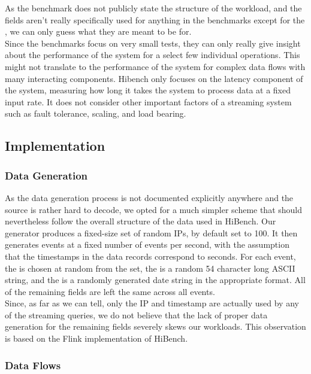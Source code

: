 As the benchmark does not publicly state the structure of the workload, and the fields aren't really specifically used for anything in the benchmarks except for the , we can only guess what they are meant to be for. \\

Since the benchmarks focus on very small tests, they can only really give insight about the performance of the system for a select few individual operations. This might not translate to the performance of the system for complex data flows with many interacting components. Hibench only focuses on the latency component of the system, measuring how long it takes the system to process data at a fixed input rate. It does not consider other important factors of a streaming system such as fault tolerance, scaling, and load bearing.

\subsection{Implementation}
\subsubsection{Data Generation}
As the data generation process is not documented explicitly anywhere and the source is rather hard to decode, we opted for a much simpler scheme that should nevertheless follow the overall structure of the data used in HiBench. Our generator produces a fixed-size set of random IPs, by default set to 100. It then generates events at a fixed number of events per second, with the assumption that the timestamps in the data records correspond to seconds. For each event, the  is chosen at random from the set, the  is a random 54 character long ASCII string, and the  is a randomly generated date string in the appropriate format. All of the remaining fields are left the same across all events. \\

Since, as far as we can tell, only the IP and timestamp are actually used by any of the streaming queries, we do not believe that the lack of proper data generation for the remaining fields severely skews our workloads. This observation is based on the Flink implementation of HiBench.

\subsubsection{Data Flows}\label{section:hibench-queries}
